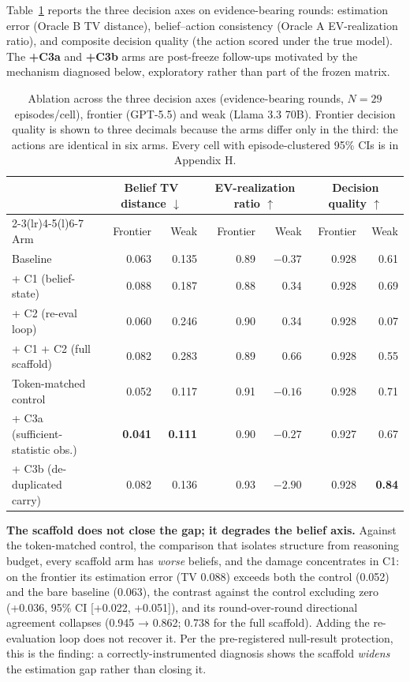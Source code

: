 \documentclass[
  10pt,
]{article}
\begin{document}
Table~\ref{tab:2} reports the three decision axes on evidence-bearing rounds: estimation error (Oracle B TV distance), belief--action consistency (Oracle A EV-realization ratio), and composite decision quality (the action scored under the true model). The \textbf{+C3a} and \textbf{+C3b} arms are post-freeze follow-ups motivated by the mechanism diagnosed below, exploratory rather than part of the frozen matrix.

\begin{table}[htbp]
\centering
\footnotesize
\caption{Ablation across the three decision axes (evidence-bearing rounds, $N=29$ episodes/cell), frontier (GPT-5.5) and weak (Llama 3.3 70B). Frontier decision quality is shown to three decimals because the arms differ only in the third: the actions are identical in six arms. Every cell with episode-clustered 95\% CIs is in Appendix H.}
\label{tab:2}
\begin{tabular}{@{}lrrrrrr@{}}
\toprule
& \multicolumn{2}{c}{Belief TV distance $\downarrow$} & \multicolumn{2}{c}{EV-realization ratio $\uparrow$} & \multicolumn{2}{c}{Decision quality $\uparrow$} \\
\cmidrule(lr){2-3}\cmidrule(lr){4-5}\cmidrule(l){6-7}
Arm & Frontier & Weak & Frontier & Weak & Frontier & Weak \\
\midrule
Baseline & 0.063 & 0.135 & 0.89 & $-0.37$ & 0.928 & 0.61 \\
\;+ C1 (belief-state) & 0.088 & 0.187 & 0.88 & 0.34 & 0.928 & 0.69 \\
\;+ C2 (re-eval loop) & 0.060 & 0.246 & 0.90 & 0.34 & 0.928 & 0.07 \\
\;+ C1 + C2 (full scaffold) & 0.082 & 0.283 & 0.89 & 0.66 & 0.928 & 0.55 \\
Token-matched control & 0.052 & 0.117 & 0.91 & $-0.16$ & 0.928 & 0.71 \\
\;+ C3a (sufficient-statistic obs.) & \textbf{0.041} & \textbf{0.111} & 0.90 & $-0.27$ & 0.927 & 0.67 \\
\;+ C3b (de-duplicated carry) & 0.082 & 0.136 & 0.93 & $-2.90$ & 0.928 & \textbf{0.84} \\
\bottomrule
\end{tabular}
\end{table}

\textbf{The scaffold does not close the gap; it degrades the belief axis.} Against the token-matched control, the comparison that isolates structure from reasoning budget, every scaffold arm has \emph{worse} beliefs, and the damage concentrates in C1: on the frontier its estimation error (TV 0.088) exceeds both the control (0.052) and the bare baseline (0.063), the contrast against the control excluding zero (+0.036, 95\% CI {[}+0.022, +0.051{]}), and its round-over-round directional agreement collapses (0.945 → 0.862; 0.738 for the full scaffold). Adding the re-evaluation loop does not recover it. Per the pre-registered null-result protection, this is the finding: a correctly-instrumented diagnosis shows the scaffold \emph{widens} the estimation gap rather than closing it.
\end{document}
